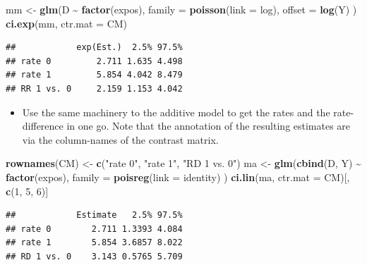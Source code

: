 \documentclass[
]{book}
\newenvironment{Shaded}{\begin{snugshade}}{\end{snugshade}}
\newcommand{\AttributeTok}[1]{\textcolor[rgb]{0.13,0.29,0.53}{#1}}
\newcommand{\DecValTok}[1]{\textcolor[rgb]{0.00,0.00,0.81}{#1}}
\newcommand{\FunctionTok}[1]{\textcolor[rgb]{0.13,0.29,0.53}{\textbf{#1}}}
\newcommand{\NormalTok}[1]{#1}
\newcommand{\OtherTok}[1]{\textcolor[rgb]{0.56,0.35,0.01}{#1}}
\newcommand{\SpecialCharTok}[1]{\textcolor[rgb]{0.81,0.36,0.00}{\textbf{#1}}}
\newcommand{\StringTok}[1]{\textcolor[rgb]{0.31,0.60,0.02}{#1}}
\providecommand{\tightlist}{%
  \setlength{\itemsep}{0pt}\setlength{\parskip}{0pt}}
\theoremstyle{definition}
\theoremstyle{definition}
\theoremstyle{definition}
\theoremstyle{definition}
\theoremstyle{remark}
\begin{document}
\begin{Shaded}
\begin{Highlighting}[]
\NormalTok{mm }\OtherTok{\textless{}{-}} \FunctionTok{glm}\NormalTok{(D }\SpecialCharTok{\textasciitilde{}} \FunctionTok{factor}\NormalTok{(expos),}
  \AttributeTok{family =} \FunctionTok{poisson}\NormalTok{(}\AttributeTok{link =}\NormalTok{ log), }\AttributeTok{offset =} \FunctionTok{log}\NormalTok{(Y)}
\NormalTok{)}
\FunctionTok{ci.exp}\NormalTok{(mm, }\AttributeTok{ctr.mat =}\NormalTok{ CM)}
\end{Highlighting}
\end{Shaded}

\begin{verbatim}
##            exp(Est.)  2.5% 97.5%
## rate 0         2.711 1.635 4.498
## rate 1         5.854 4.042 8.479
## RR 1 vs. 0     2.159 1.153 4.042
\end{verbatim}

\begin{itemize}
\tightlist
\item
  Use the same machinery to the additive model to get the rates
  and the rate-difference in one go. Note that the annotation of the
  resulting estimates are via the column-names of the contrast matrix.
\end{itemize}

\begin{Shaded}
\begin{Highlighting}[]
\FunctionTok{rownames}\NormalTok{(CM) }\OtherTok{\textless{}{-}} \FunctionTok{c}\NormalTok{(}\StringTok{"rate 0"}\NormalTok{, }\StringTok{"rate 1"}\NormalTok{, }\StringTok{"RD 1 vs. 0"}\NormalTok{)}
\NormalTok{ma }\OtherTok{\textless{}{-}} \FunctionTok{glm}\NormalTok{(}\FunctionTok{cbind}\NormalTok{(D, Y) }\SpecialCharTok{\textasciitilde{}} \FunctionTok{factor}\NormalTok{(expos),}
  \AttributeTok{family =} \FunctionTok{poisreg}\NormalTok{(}\AttributeTok{link =}\NormalTok{ identity)}
\NormalTok{)}
\FunctionTok{ci.lin}\NormalTok{(ma, }\AttributeTok{ctr.mat =}\NormalTok{ CM)[, }\FunctionTok{c}\NormalTok{(}\DecValTok{1}\NormalTok{, }\DecValTok{5}\NormalTok{, }\DecValTok{6}\NormalTok{)]}
\end{Highlighting}
\end{Shaded}

\begin{verbatim}
##            Estimate   2.5% 97.5%
## rate 0        2.711 1.3393 4.084
## rate 1        5.854 3.6857 8.022
## RD 1 vs. 0    3.143 0.5765 5.709
\end{verbatim}
\end{document}
